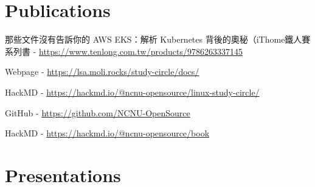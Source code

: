 \documentclass[]{deedy-resume-openfont}
\begin{document}
\begin{minipage}[t]{1\textwidth}
\section{Publications}

\null\hfill{}
\begin{tightemize}
    \item 那些文件沒有告訴你的 AWS EKS：解析 Kubernetes 背後的奧秘（iThome鐵人賽系列書 - \href{https://www.tenlong.com.tw/products/9786263337145}{https://www.tenlong.com.tw/products/9786263337145}
\end{tightemize}
\sectionsep

\null\hfill{}
\begin{tightemize}
    \item Webpage - \href{https://lsa.moli.rocks/study-circle/docs/}{https://lsa.moli.rocks/study-circle/docs/}
    \item HackMD - \href{https://hackmd.io/@ncnu-opensource/linux-study-circle/}{https://hackmd.io/@ncnu-opensource/linux-study-circle/}
\end{tightemize}
\sectionsep

\null\hfill{}
\begin{tightemize}
    \item GitHub - \href{https://github.com/NCNU-OpenSource}{https://github.com/NCNU-OpenSource}
    \item HackMD - \href{https://hackmd.io/@ncnu-opensource/book}{https://hackmd.io/@ncnu-opensource/book}
\end{tightemize}

\section{Presentations}


\null\hfill{}


\end{minipage}
\end{document}
